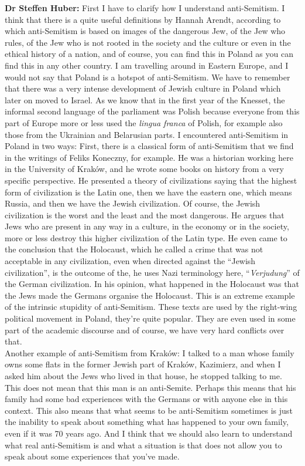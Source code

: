 \textbf{Dr Steffen Huber:} First I have to clarify how I understand anti-Semitism. I think that there is a quite useful definitions by Hannah Arendt, according to which anti-Semitism is based on images of the dangerous Jew, of the Jew who rules, of the Jew who is not rooted in the society and the culture or even in the ethical history of a nation, and of course, you can find this in Poland as you can find this in any other country. I am travelling around in Eastern Europe, and I would not say that Poland is a hotspot of anti-Semitism. We have to remember that there was a very intense development of Jewish culture in Poland which later on moved to Israel. As we know that in the first year of the Knesset, the informal second language of the parliament was Polish because everyone from this part of Europe more or less used the \textit{lingua franca} of Polish, for example also those from the Ukrainian and Belarusian parts. I encountered anti-Semitism in Poland in two ways: First, there is a classical form of anti-Semitism that we find in the writings of Feliks Koneczny, for example. He was a historian working here in the University of Kraków, and he wrote some books on history from a very specific perspective. He presented a theory of civilizations saying that the highest form of civilization is the Latin one, then we have the eastern one, which means Russia, and then we have the Jewish civilization. Of course, the Jewish civilization is the worst and the least and the most dangerous. He argues that Jews who are present in any way in a culture, in the economy or in the society, more or less destroy this higher civilization of the Latin type. He even came to the conclusion that the Holocaust, which he called a crime that was not acceptable in any civilization, even when directed against the ``Jewish civilization'', is the outcome of the, he uses Nazi terminology here, ``\textit{Verjudung}'' of the German civilization. In his opinion, what happened in the Holocaust was that the Jews made the Germans organise the Holocaust. This is an extreme example of the intrinsic stupidity of anti-Semitism. These texts are used by the right-wing political movement in Poland, they're quite popular. They are even used in some part of the academic discourse and of course, we have very hard conflicts over that.\\
Another example of anti-Semitism from Kraków: I talked to a man whose family owns some flats in the former Jewish part of Kraków, Kazimierz, and when I asked him about the Jews who lived in that house, he stopped talking to me. This does not mean that this man is an anti-Semite. Perhaps this means that his family had some bad experiences with the Germans or with anyone else in this context. This also means that what seems to be anti-Semitism sometimes is just the inability to speak about something what has happened to your own family, even if it was 70 years ago. And I think that we should also learn to understand what real anti-Semitism is and what a situation is that does not allow you to speak about some experiences that you’ve made. 


